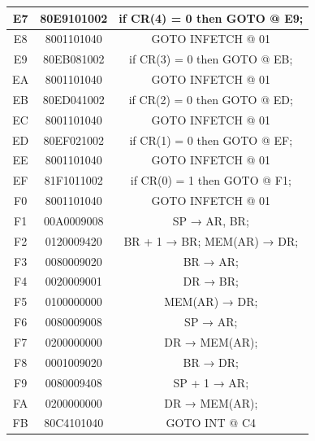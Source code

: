\begin{center}
\begin{tabular}{|c|c|c|}
        E7    & 80E9101002   & if CR(4) = 0 then GOTO @ E9;          \\
        \hline
        E8    & 8001101040   & GOTO INFETCH @ 01                     \\
        \hline
        E9    & 80EB081002   & if CR(3) = 0 then GOTO @ EB;          \\
        \hline
        EA    & 8001101040   & GOTO INFETCH @ 01                     \\
        \hline
        EB    & 80ED041002   & if CR(2) = 0 then GOTO @ ED;          \\
        \hline
        EC    & 8001101040   & GOTO INFETCH @ 01                     \\
        \hline
        ED    & 80EF021002   & if CR(1) = 0 then GOTO @ EF;          \\
        \hline
        EE    & 8001101040   & GOTO INFETCH @ 01                     \\
        \hline
        EF    & 81F1011002   & if CR(0) = 1 then GOTO @ F1;          \\
        \hline
        F0    & 8001101040   & GOTO INFETCH @ 01                     \\
        \hline
        F1    & 00A0009008   & SP → AR, BR;                         \\
        \hline
        F2    & 0120009420   & BR + 1 → BR; MEM(AR) → DR;          \\
        \hline
        F3    & 0080009020   & BR → AR;                             \\
        \hline
        F4    & 0020009001   & DR → BR;                             \\
        \hline
        F5    & 0100000000   & MEM(AR) → DR;                        \\
        \hline
        F6    & 0080009008   & SP → AR;                             \\
        \hline
        F7    & 0200000000   & DR → MEM(AR);                        \\
        \hline
        F8    & 0001009020   & BR → DR;                             \\
        \hline
        F9    & 0080009408   & SP + 1 → AR;                         \\
        \hline
        FA    & 0200000000   & DR → MEM(AR);                        \\
        \hline
        FB    & 80C4101040   & GOTO INT @ C4                         \\
        \hline
    \end{tabular}
\end{center}


